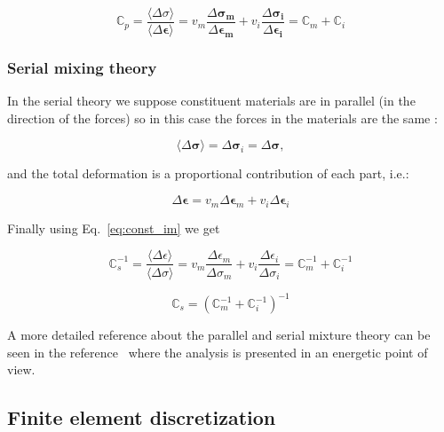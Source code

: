 \documentclass[preprint]{elsarticle}
\begin{document}
\begin{equation}
\mathbb{C}_p = \frac{\langle\Delta \sigma\rangle}{\langle\Delta \bm{\epsilon}\rangle} = 
v_m\frac{\Delta \bm{\sigma_m}}{\Delta \bm{\epsilon_m}} +
v_i\frac{\Delta \bm{\sigma_i}}{\Delta \bm{\epsilon_i}} = 
\mathbb{C}_m + \mathbb{C}_i
\label{eq:parallel_mix}
\end{equation}


\subsubsection{Serial mixing theory}
In the serial theory we suppose constituent materials are in 
parallel (in the direction of the forces) so in
this case the forces in the materials are the same :

\begin{equation}
\langle \Delta \bm{\sigma} \rangle= \Delta \bm{\sigma}_i = \Delta \bm{\sigma},
\end{equation}

\noindent
and the total deformation is a proportional contribution of each part, i.e.:

\begin{equation}
\Delta \bm{\epsilon} = v_m \Delta \bm{\epsilon}_m + v_i \Delta \bm{\epsilon}_i
\end{equation}

Finally using Eq.~\ref{eq:const_im} we get

\begin{equation*}
\mathbb{C}_s^{-1} = \frac{\langle\Delta \epsilon\rangle}{\langle\Delta \sigma\rangle} = 
v_m\frac{\Delta \epsilon_m}{\Delta \sigma_m} +
v_i\frac{\Delta \epsilon_i}{\Delta \sigma_i} = 
\mathbb{C}_m^{-1} + \mathbb{C}_i^{-1}
\end{equation*}

\begin{equation}
\mathbb{C}_s =
\left( \mathbb{C}_m^{-1} + \mathbb{C}_i^{-1} \right)^{-1}
\label{eq:serial_mix}
\end{equation}

A more detailed reference about the parallel and serial mixture theory can be seen in the
reference~\cite{oller-composites} where the analysis is presented in an
energetic point of view.


\subsection{Finite element discretization}
\end{document}
